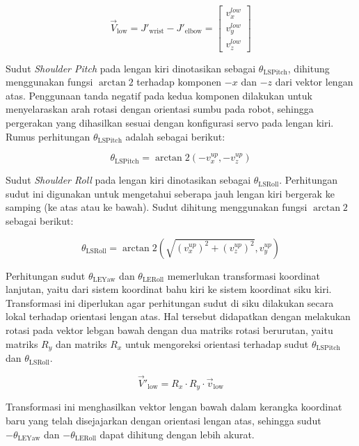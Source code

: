 \begin{equation}
\vec{V}_{\text{low}} = J'_{\text{wrist}} - J'_{\text{elbow}} = 
\begin{bmatrix}
v^{low}_x \\
v^{low}_y \\
v^{low}_z
\end{bmatrix}
\end{equation}

Sudut \textit{Shoulder Pitch} pada lengan kiri dinotasikan sebagai $\theta_{\text{LSPitch}}$, dihitung menggunakan fungsi $\arctan2$ terhadap komponen $-x$ dan $-z$ dari vektor lengan atas. Penggunaan tanda negatif pada kedua komponen dilakukan untuk menyelaraskan arah rotasi dengan orientasi sumbu pada robot, sehingga pergerakan yang dihasilkan sesuai dengan konfigurasi servo pada lengan kiri. Rumus perhitungan $\theta_{\text{LSPitch}}$ adalah sebagai berikut:

\begin{equation}
\theta_{\text{LSPitch}} = \arctan2\left(-v^{up}_x, -v^{up}_z\right)
\end{equation}

Sudut \textit{Shoulder Roll} pada lengan kiri dinotasikan sebagai $\theta_{\text{LSRoll}}$. Perhitungan sudut ini digunakan untuk mengetahui seberapa jauh lengan kiri bergerak ke samping (ke atas atau ke bawah). Sudut dihitung menggunakan fungsi $\arctan2$ sebagai berikut:

\begin{equation}
\theta_{\text{LSRoll}} = \arctan2\left(\sqrt{(v^{up}_x)^2 + (v^{up}_z)^2}, v^{up}_y\right)
\end{equation}

Perhitungan sudut $\theta_{\text{LEYaw}}$ dan $\theta_{\text{LERoll}}$ memerlukan transformasi koordinat lanjutan, yaitu dari sistem koordinat bahu kiri ke sistem koordinat siku kiri. Transformasi ini diperlukan agar perhitungan sudut di siku dilakukan secara lokal terhadap orientasi lengan atas. Hal tersebut didapatkan dengan melakukan rotasi pada vektor lebgan bawah dengan dua matriks rotasi berurutan, yaitu matriks $R_y$ dan matriks $R_x$ untuk mengoreksi orientasi terhadap sudut $\theta_{\text{LSPitch}}$ dan $\theta_{\text{LSRoll}}$.

\begin{equation}
\vec{V}'_{\text{low}} = R_x \cdot R_y \cdot \vec{v}_{\text{low}}
\end{equation}

Transformasi ini menghasilkan vektor lengan bawah dalam kerangka koordinat baru yang telah disejajarkan dengan orientasi lengan atas, sehingga sudut $-\theta_{\text{LEYaw}}$ dan $-\theta_{\text{LERoll}}$ dapat dihitung dengan lebih akurat.

